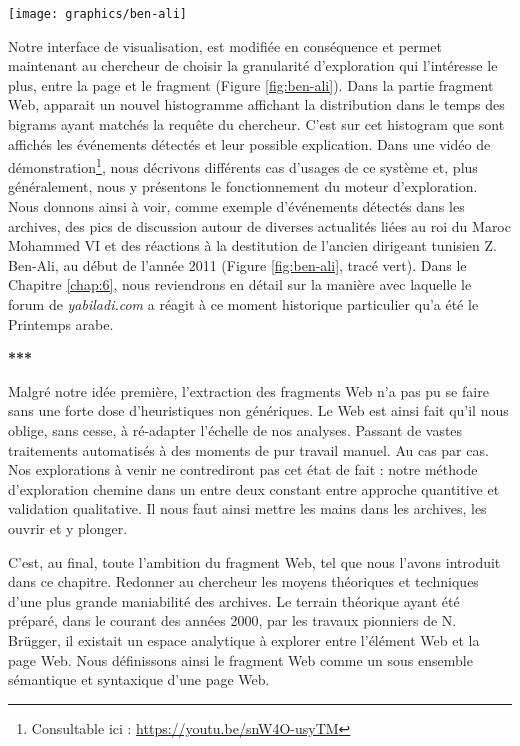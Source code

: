 \documentclass[symmetric,justified,marginals=raggedouter]{tufte-book}
\begin{document}
\begin{figure*}%
  \texttt{[image: graphics/ben-ali]}
  \caption{Ajout de la détection d'événements à notre interface d'exploration}
  \label{fig:ben-ali}
\end{figure*} 

\noindent Notre interface de visualisation, est modifiée en conséquence et permet maintenant au chercheur de choisir la granularité d'explo\-ration qui l'intéresse le plus, entre la page et le fragment (Figure \ref{fig:ben-ali}). Dans la partie fragment Web, apparait un nouvel histogramme affichant la distribution dans le temps des bigrams ayant matchés la requête du chercheur. C'est sur cet histogram que sont affichés les événements détectés et leur possible explication. Dans une vidéo de démonstration\footnote{Consultable ici : \url{https://youtu.be/snW4O-usyTM}}, nous décrivons différents cas d'usages de ce système et, plus généralement, nous y présentons le fonctionnement du moteur d'exploration. Nous donnons ainsi à voir, comme exemple d'événements détectés dans les archives, des pics de discussion autour de diverses actualités liées au roi du Maroc Mohammed VI et des réactions à la destitution de l'ancien dirigeant tunisien Z. Ben-Ali, au début de l'année 2011 (Figure \ref{fig:ben-ali}, tracé vert). Dans le Chapitre \ref{chap:6}, nous reviendrons en détail sur la manière avec laquelle le forum de \textit{yabiladi.com} a réagit à ce moment historique particulier qu'a été le Printemps arabe.

\begin{center}
	\textbf{***}
\end{center}

\noindent Malgré notre idée première, l'extraction des fragments Web n'a pas pu se faire sans une forte dose d'heuristiques non génériques. Le Web est ainsi fait qu'il nous oblige, sans cesse, à ré-adapter l'échelle de nos analyses. Passant de vastes traitements automatisés à des moments de pur travail manuel. Au cas par cas. Nos explorations à venir ne contrediront pas cet état de fait : notre méthode d'exploration chemine dans un entre deux constant entre approche quantitive et validation qualitative. Il nous faut ainsi mettre les mains dans les archives, les ouvrir et y plonger.

C'est, au final, toute l'ambition du fragment Web, tel que nous l'avons introduit dans ce chapitre. Redonner au chercheur les moyens théoriques et techniques d'une plus grande maniabilité des archives. Le terrain théorique ayant été préparé, dans le courant des années 2000, par les travaux pionniers de N. Brügger, il existait un espace analytique à explorer entre l'élément Web et la page Web. Nous définissons ainsi le fragment Web comme un sous ensemble sémantique et syntaxique d'une page Web.
\end{document}
